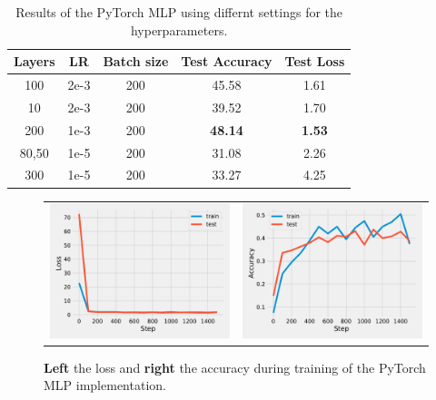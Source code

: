 \documentclass{article}
\newcommand\·{\ensuremath{\cdot}}
\newcommand\…{\ensuremath{\ldots}}
\newcommand\1{\ensuremath{\mathds{1}}}
\begin{document}
\begin{table}
  \centering
  \begin{tabular}{ccccc}
    Layers & LR & Batch size & Test Accuracy & Test Loss\\\toprule
    100 & 2e-3 & 200 & 45.58 & 1.61\\
    10 & 2e-3 & 200 & 39.52 & 1.70\\
    200 & 1e-3 & 200 & \textbf{48.14} & \textbf{1.53}\\
    80,50 & 1e-5 & 200 & 31.08 & 2.26\\
    300 & 1e-5 & 200 & 33.27 & 4.25\\
  \end{tabular}
  \caption{Results of the PyTorch MLP using differnt settings for the hyperparameters.}
  \label{tab:pytorch_mlp}
\end{table}

\begin{figure}
  \begin{tabularx}{\linewidth}{XX}
    \includegraphics[width=\linewidth]{assignment_1/code/torch_loss.pdf} &
    \includegraphics[width=\linewidth]{assignment_1/code/torch_accuracy.pdf}
  \end{tabularx}
  \caption{\textbf{Left} the loss and \textbf{right} the accuracy during training of the PyTorch MLP implementation.}
  \label{fig:pytorch_mlp}
\end{figure}
\end{document}
